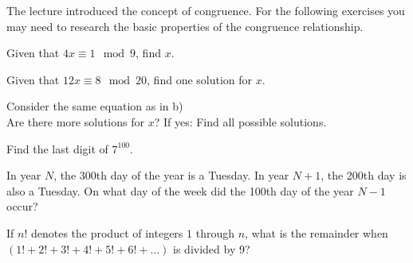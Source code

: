 \begin{aufgabe}
The lecture introduced the concept of congruence.
For the following exercises you may need to research the basic properties of the congruence relationship.

\begin{teilaufgabe}
\item Given that $4x \equiv 1 \mod{9}$, find $x$.
    
\end{teilaufgabe}

\begin{teilaufgabe}
\item Given that $12x \equiv 8 \mod{20}$, find one solution for $x$.
    
\end{teilaufgabe}

\begin{teilaufgabe}
\item Consider the same equation as in b) \\
Are there more solutions for $x$? If yes: Find all possible solutions.
    
\end{teilaufgabe}

\begin{teilaufgabe}
\item Find the last digit of $7^{100}$.

\end{teilaufgabe}

\begin{teilaufgabe}
\item In year $N$, the 300th day of the year is a Tuesday. In year $N+1$, the 200th day is also a Tuesday. On what day of the week did the 100th day of the year $N-1$ occur?
  
\end{teilaufgabe}

\begin{teilaufgabe}
\item If $n!$ denotes the product of integers $1$ through $n$, what is the remainder when $(1! + 2! + 3! + 4! + 5! + 6! + ...)$ is divided by 9?
    
\end{teilaufgabe}

\end{aufgabe}
